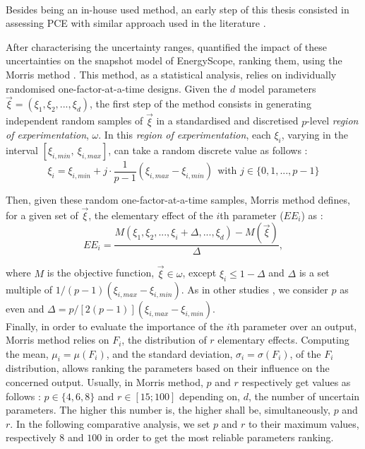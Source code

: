 \\

\noindent
Besides being an in-house used method, an early step of this thesis consisted in assessing \gls{PCE} with similar approach used in the literature \cite{limpens2020impact}. 

After characterising the uncertainty ranges, \citet{Moret2017} quantified the impact of these uncertainties on the snapshot model of EnergyScope,  \ie ranking them, using the Morris method \cite{morris_factorial_1991}.  This method, as a statistical analysis, relies on individually randomised one-factor-at-a-time designs. Given the $d$ model parameters $\vec{\xi}=(\xi_1,\xi_2,...,\xi_d)$, the first step of the method consists in generating independent random samples of $\vec{\xi}$ in a standardised and discretised $p$-level \textit{region of experimentation}, $\omega$. In this \textit{region of experimentation}, each $\xi_i$, varying in the interval $[\xi_{i,min},~\xi_{i,max}]$, can take a random discrete value as follows :
\begin{equation}
  \xi_{i}=\xi_{i,min}+j\cdot\frac{1}{p-1}\left(\xi_{i,max}-\xi_{i,min}\right)~~\text{with }j\in\{0,1,...,p-1\}
\end{equation}

Then, given these random one-factor-at-a-time samples, Morris method defines, for a given set of $\vec{\xi}$, the elementary effect of the $i$th parameter ($EE_i$) as :
\begin{equation}
  EE_{i}=\frac{M(\xi_1,\xi_2,...,\xi_i+\Delta,...,\xi_d)-M(\vec{\xi})}{\Delta},
\end{equation}

\noindent where $M$ is the objective function, $\vec{\xi}\in\omega$, except $\xi_i\leq1-\Delta$ and $\Delta$ is a set multiple of $1/(p-1)\left(\xi_{i,max}-\xi_{i,min}\right)$. As in other studies \cite{Sin2009,Moret2017,Moret2017PhDThesis}, we consider $p$ as even and $\Delta=p/[2(p-1)]\left(\xi_{i,max}-\xi_{i,min}\right)$.\\

Finally, in order to evaluate the importance of the $i$th parameter over an output, Morris method relies on $F_i$, the distribution of $r$ elementary effects. Computing the mean, $\mu_{i}=\mu(F_{i})$, and the standard deviation, $\sigma_{i}=\sigma(F_{i})$, of the $F_{i}$ distribution, allows ranking the parameters based on their influence on the concerned output. Usually, in Morris method, $p$ and $r$ respectively get values as follows : $p\in \{4,6,8\}$ and $r\in [15;100]$ depending on, $d$, the number of uncertain parameters. The higher this number is,  the higher shall be, simultaneously, $p$ and $r$. In the following comparative analysis, we set $p$ and $r$ to their maximum values, respectively $8$ and $100$ in order to get the most reliable parameters ranking.\\

